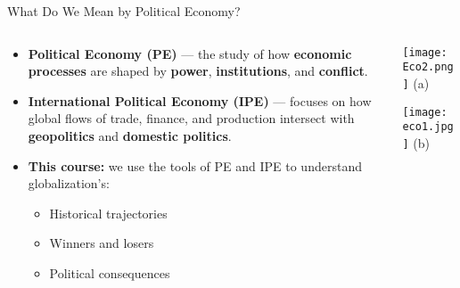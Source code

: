 \documentclass{beamer}
\begin{document}
\begin{frame}{What Do We Mean by Political Economy?}

\begin{columns}[T] %
    \begin{column}{0.65\textwidth}
        \begin{itemize}
            \item \textbf{Political Economy (PE)} — the study of how \textbf{economic processes} are shaped by \textbf{power}, \textbf{institutions}, and \textbf{conflict}.
            
            \item \textbf{International Political Economy (IPE)} — focuses on how global flows of trade, finance, and production intersect with \textbf{geopolitics} and \textbf{domestic politics}.

            \item \textbf{This course:} we use the tools of PE and IPE to understand globalization’s:
            \begin{itemize}
                \item Historical trajectories
                \item Winners and losers
                \item Political consequences
            \end{itemize}
        \end{itemize}
    \end{column}

    \begin{column}{0.3\textwidth}
        \begin{minipage}{\linewidth}
            \texttt{[image: Eco2.png]}
            \centering\small (a)
        \end{minipage}
        \vspace{0.5em}
        
        \begin{minipage}{\linewidth}
            \texttt{[image: eco1.jpg]}
            \centering\small (b)
        \end{minipage}
    \end{column}
\end{columns}

\end{frame}
\end{document}
